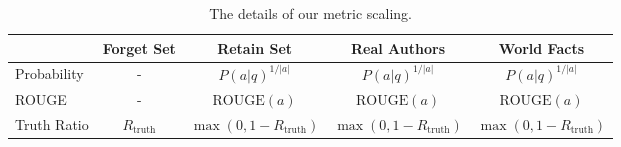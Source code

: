 
\begin{table}[t!]
    \centering
    \footnotesize
    \caption{The details of our metric scaling.}
    \label{tab:scaled-metrics}    
    \begin{tabular}{lcccc}
        \toprule
         &  Forget Set&  Retain Set&  Real Authors& World Facts\\
         \midrule
         Probability &   - &  $P(a|q)^{1/\vert a \vert}$&  $P(a|q)^{1/\vert a \vert}$& $P(a|q)^{1/\vert a \vert}$\\
         ROUGE &  - &  $\text{ROUGE}(a)$&  $\text{ROUGE}(a)$& $\text{ROUGE}(a)$\\
         Truth Ratio &  $R_\text{truth}$&  $\max(0, 1 - R_\text{truth})$&  $\max(0, 1 - R_\text{truth})$& $\max(0, 1 - R_\text{truth})$\\
         \bottomrule
    \end{tabular}
\end{table}